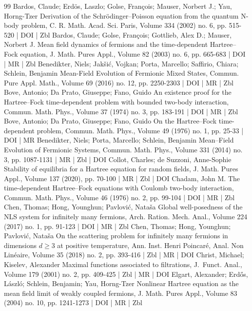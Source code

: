 \begin{thebibliography}{99}
Bardos, Claude; Erdös, Laszlo; Golse, François; Mauser, Norbert J.; Yau, Horng-Tzer Derivation of the Schrödinger–Poisson equation from the quantum N-body problem, C. R. Math. Acad. Sci. Paris, Volume 334 (2002) no. 6, pp. 515-520 | DOI | Zbl
Bardos, Claude; Golse, François; Gottlieb, Alex D.; Mauser, Norbert J. Mean field dynamics of fermions and the time-dependent Hartree–Fock equation, J. Math. Pures Appl., Volume 82 (2003) no. 6, pp. 665-683 | DOI | MR | Zbl
Benedikter, Niels; Jakšić, Vojkan; Porta, Marcello; Saffirio, Chiara; Schlein, Benjamin Mean-Field Evolution of Fermionic Mixed States, Commun. Pure Appl. Math., Volume 69 (2016) no. 12, pp. 2250-2303 | DOI | MR | Zbl
Bove, Antonio; Da Prato, Giuseppe; Fano, Guido An existence proof for the Hartree–Fock time-dependent problem with bounded two-body interaction, Commun. Math. Phys., Volume 37 (1974) no. 3, pp. 183-191 | DOI | MR | Zbl
Bove, Antonio; Da Prato, Giuseppe; Fano, Guido On the Hartree–Fock time-dependent problem, Commun. Math. Phys., Volume 49 (1976) no. 1, pp. 25-33 | DOI | MR
Benedikter, Niels; Porta, Marcello; Schlein, Benjamin Mean–Field Evolution of Fermionic Systems, Commun. Math. Phys., Volume 331 (2014) no. 3, pp. 1087-1131 | MR | Zbl | DOI
Collot, Charles; de Suzzoni, Anne-Sophie Stability of equilibria for a Hartree equation for random fields, J. Math. Pures Appl., Volume 137 (2020), pp. 70-100 | MR | Zbl | DOI
Chadam, John M. The time-dependent Hartree–Fock equations with Coulomb two-body interaction, Commun. Math. Phys., Volume 46 (1976) no. 2, pp. 99-104 | DOI | MR | Zbl
Chen, Thomas; Hong, Younghun; Pavlović, Nataša Global well-posedness of the NLS system for infinitely many fermions, Arch. Ration. Mech. Anal., Volume 224 (2017) no. 1, pp. 91-123 | DOI | MR | Zbl
Chen, Thomas; Hong, Younghun; Pavlović, Nataša On the scattering problem for infinitely many fermions in dimensions $d\ge 3$ at positive temperature, Ann. Inst. Henri Poincaré, Anal. Non Linéaire, Volume 35 (2018) no. 2, pp. 393-416 | Zbl | MR | DOI
Christ, Michael; Kiselev, Alexander Maximal functions associated to filtrations, J. Funct. Anal., Volume 179 (2001) no. 2, pp. 409-425 | Zbl | MR | DOI
Elgart, Alexander; Erdős, László; Schlein, Benjamin; Yau, Horng-Tzer Nonlinear Hartree equation as the mean field limit of weakly coupled fermions, J. Math. Pures Appl., Volume 83 (2004) no. 10, pp. 1241-1273 | DOI | MR | Zbl

\end{thebibliography}
